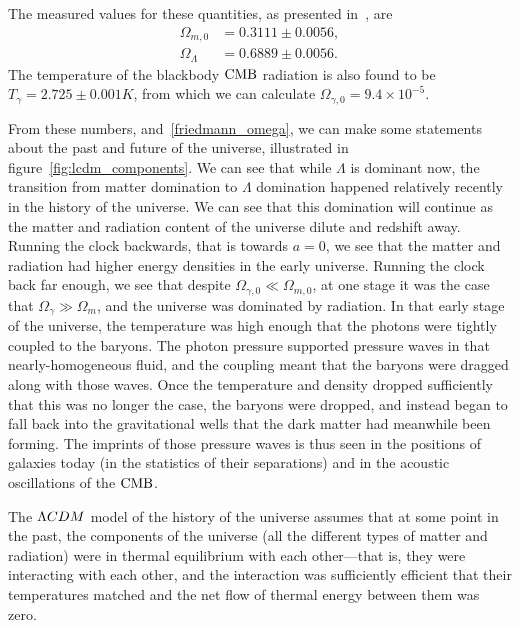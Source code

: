     The measured values for these quantities, as presented in~\cite{Planck_parameters_2018},
    are
    \begin{align}\label{measured_params}
        \Omega_{m,0} &= 0.3111 \pm 0.0056,\\
        \Omega_{\Lambda} &=  0.6889 \pm 0.0056.
    \end{align}
    The temperature of the blackbody $\text{CMB}$ radiation is
    also found to be $T_{\gamma}=2.725\pm0.001K$, from which
    we can calculate $\Omega_{\gamma,0}=9.4\times10^{-5}$.


    From these numbers, and~\eqref{friedmann_omega}, we can make some statements
    about the past and future of the universe, illustrated in figure~\ref{fig:lcdm_components}.
    We can see that while $\Lambda$ is dominant now, the transition from matter domination
    to $\Lambda$ domination happened relatively recently in the history of the universe.
    We can see that this domination will continue as the matter and radiation content of the
    universe dilute and redshift away.
    Running the clock backwards, that is towards $a=0$, we see that the matter and radiation had
    higher energy densities in the early universe. Running the clock back far enough, we see
    that despite $\Omega_{\gamma,0}\ll\Omega_{m,0}$, at one stage it was the
    case that $\Omega_{\gamma}\gg\Omega_{m}$, and the universe was dominated by radiation.
    In that early stage of the universe, the temperature was high enough that the photons
    were tightly coupled to the baryons. The photon pressure supported pressure waves in that
    nearly-homogeneous fluid, and the coupling meant that the baryons were dragged along with those
    waves. Once the temperature and density dropped sufficiently that this was no longer the case,
    the baryons were dropped, and instead began to fall back into the gravitational wells that the dark matter
    had meanwhile been forming. The imprints of those pressure waves is thus seen in the positions
    of galaxies today (in the statistics of their separations) and in the acoustic oscillations of the $\text{CMB}$.


    The $\Lambda CDM$ model of the history of the universe assumes that at some point in the
    past, the components of the universe (all the different types of matter and radiation)
    were in thermal equilibrium with each other---that is, they were interacting with each other,
    and the interaction was sufficiently efficient that their temperatures matched
    and the net flow of thermal energy between them was zero.


